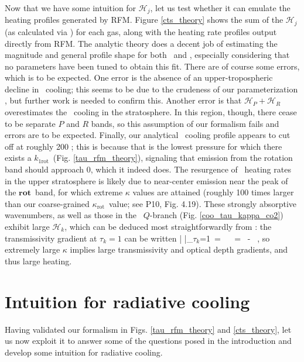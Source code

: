 \documentclass[10pt]{article}
\newcommand{\trans}{\ensuremath{\mathcal{T}}}
\newcommand{\ch}{\ensuremath{\mathcal{H}}}
\newcommand{\tauk}{\ensuremath{\tau_k}}
\newcommand{\kapparot}{\ensuremath{\kappa_{\mathrm{rot}}}}
\newcommand{\konerot}{\ensuremath{k_{1\mathrm{rot}}}}
\newcommand{\rot}{\ensuremath{\mathbf{rot}}}
\begin{document}
 Now that we have some intuition for $\ch_j$, let us test whether it can emulate the heating profiles generated by RFM. Figure \ref{cts_theory} shows the sum of the $\ch_j$ (as calculated via ) for each gas, along with the heating rate profiles output directly from RFM. The analytic theory does a decent job of estimating the magnitude and general profile shape for both \htwo\ and \cotwo, especially considering that no parameters have been tuned to obtain this fit. There are of course some errors, which is to be expected. One error is  the absence of an upper-tropospheric decline in \cotwo\ cooling; this  seems to be due to the crudeness of our parameterization , but further work is needed to confirm this. Another error is that $\ch_P + \ch_R$ overestimates the \cotwo\ cooling in the stratosphere. In this region, though, there cease to be separate $P$ and $R$ bands, so this assumption of our formalism fails and errors are to be expected. Finally, our analytical \htwo\ cooling profile appears to cut off at roughly 200 \hPa; this is because that is the lowest pressure for which there exists a \konerot\ (Fig. \ref{tau_rfm_theory}), signaling that emission from the rotation band should approach 0, which it indeed does. The resurgence of \htwo\ heating rates in the upper stratosphere is likely due to near-center emission near the peak of the \rot\ band, for which extreme $\kappa$ values are attained (roughly 100 times larger than our coarse-grained \kapparot\ value; see P10, Fig. 4.19). These strongly absorptive wavenumbers, as well as those in the \cotwo\ $Q$-branch (Fig. \ref{coo_tau_kappa_co2}) exhibit large $\ch_k$, which can be deduced most straightforwardly from : the transmissivity gradient at $\tauk=1$ can be written 
 \beqn
	 \left|	\der{\trans_k}{p} \right|_{\tauk=1}\ = \ \der{\tauk}{p} \ = \ -  \ ,
\eeqn
 so extremely large $\kappa$ implies large transmissivity and optical depth gradients, and thus large heating.
 
\section{Intuition for radiative cooling}
Having validated our formalism in Figs. \ref{tau_rfm_theory} and \ref{cts_theory}, let us now exploit it to answer some of the questions posed in the introduction and develop some intuition for radiative cooling.
\end{document}
